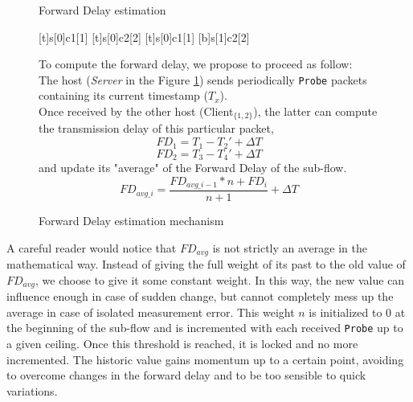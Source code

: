 \begin{figure}[!h]
\begin{minipage}[c]{.55\linewidth}
\begin{msc}[r]{Forward Delay estimation}

\setlength{\instfootheight}{0em}
\setlength{\instheadheight}{0em}
\setlength{\instdist}{0.25\linewidth}
\setlength{\levelheight}{3em}


[t]{s}[0]{c1}[1]
\nextlevel
{}[t]{s}[0]{c2}[2]
\nextlevel
{}[t]{s}[0]{c1}[1]
[b]{s}[1]{c2}[2]
\nextlevel
{}
\nextlevel
{}
\nextlevel
\end{msc}
\caption{Forward Delay estimation mechanism}
\label{fig:forwardDelayComputation}
\end{minipage}
\begin{minipage}[c]{.44\linewidth}
To compute the forward delay, we propose to proceed as follow:\\

The host (\textit{Server} in the Figure \ref{fig:forwardDelayComputation}) sends periodically \verb!Probe! packets containing its current timestamp ($T_x$).\\

Once received by the other host (Client$_{\{1,2\}}$), the latter can compute the transmission delay of this particular packet,
$$FD_1 = T_1 - T_2' + \Delta{}T$$
$$FD_2 = T_3 - T_4' + \Delta{}T$$
and update its "average" of the Forward Delay of the sub-flow.
$$FD_{avg\_i} = \frac{FD_{avg\_i-1} * n + FD_i}{n + 1} + \Delta T$$
\end{minipage}
\end{figure}

A careful reader would notice that $FD_{avg}$ is not strictly an average in the mathematical way. Instead of giving the full weight of its past to the old value of $FD_{avg}$, we choose to give it some constant weight. In this way, the new value can influence enough in case of sudden change, but cannot completely mess up the average in case of isolated measurement error. This weight $n$ is initialized to 0 at the beginning of the sub-flow and is incremented with each received \verb!Probe! up to a given ceiling. Once this threshold is reached, it is locked and no more incremented. The historic value gains momentum up to a certain point, avoiding to overcome changes in the forward delay and to be too sensible to quick variations.

